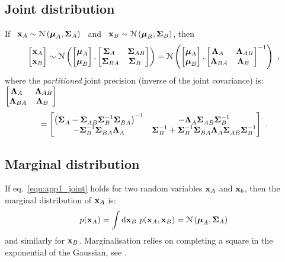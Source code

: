     \subsection{Joint distribution}
      If ~$\mathbf{x}_{A} \sim \mathcal{N} \left( \boldsymbol{\mu}_A, \mathbf{\Sigma}_A \right)$~ and ~$\mathbf{x}_{B} \sim \mathcal{N} \left( \boldsymbol{\mu}_B, \mathbf{\Sigma}_B \right)$, then
      \begin{equation} \label{equ:app1_joint}
	\begin{bmatrix} \mathbf{x}_A \\ \mathbf{x}_B \end{bmatrix} \sim \mathcal{N} \left(  \begin{bmatrix} \boldsymbol{\mu}_A \\ \boldsymbol{\mu}_B \end{bmatrix} ,  \begin{bmatrix}  \mathbf{\Sigma}_{A~} &\mathbf{\Sigma}_{AB} \\ \mathbf{\Sigma}_{BA} &\mathbf{\Sigma}_{B~}  \end{bmatrix}  \right) = \mathcal{N} \left(  \begin{bmatrix} \boldsymbol{\mu}_A \\ \boldsymbol{\mu}_B \end{bmatrix} ,  \begin{bmatrix}  \mathbf{\Lambda}_{A~} &\mathbf{\Lambda}_{AB} \\ \mathbf{\Lambda}_{BA} &\mathbf{\Lambda}_{B~}  \end{bmatrix}^{-1}  \right) ~,
      \end{equation}
      where the \emph{partitioned} joint precision (inverse of the joint covariance) is: $\begin{bmatrix}  \mathbf{\Lambda}_{A~} &\mathbf{\Lambda}_{AB} \\ \mathbf{\Lambda}_{BA} &\mathbf{\Lambda}_{B~}  \end{bmatrix}$
      \begin{equation} \label{equ:app1_blkinv}
	= \begin{bmatrix}  \left(\mathbf{\Sigma}^{~}_{A} - \mathbf{\Sigma}_{AB}^{~} \mathbf{\Sigma}^{-1}_{B} \mathbf{\Sigma}_{BA}^{~}\right)^{-1} &-\mathbf{\Lambda}_A^{~}\mathbf{\Sigma}^{~}_{AB}\mathbf{\Sigma}_{B}^{-1} \\
	-\mathbf{\Sigma}_B^{-1}\mathbf{\Sigma}^{~}_{BA}\mathbf{\Lambda}_{A}^{~} & \mathbf{\Sigma}^{-1}_B + \mathbf{\Sigma}^{-1}_B \mathbf{\Sigma}^{~}_{BA}\mathbf{\Lambda}^{~}_{A}\mathbf{\Sigma}^{~}_{AB}\mathbf{\Sigma}^{-1}_B \end{bmatrix} ~.
      \end{equation}


    \subsection{Marginal distribution}
      If eq.~\eqref{equ:app1_joint} holds for two random variables $\mathbf{x}_A$ and $\mathbf{x}_b$, then the marginal distribution of $\mathbf{x}_A$ is:
      \begin{equation} \label{equ:app1_marginal}
	p(\mathbf{x}_A)  = \int \textrm{d}\mathbf{x}_B ~ p(\mathbf{x}_A, \mathbf{x}_B) = \mathcal{N} \left( \boldsymbol{\mu}_A, \mathbf{\Sigma}_A \right)
      \end{equation}
      and similarly for $\mathbf{x}_B$. Marginalisation relies on completing a square in the exponential of the Gaussian, see \citep{Bishop:book06}.


